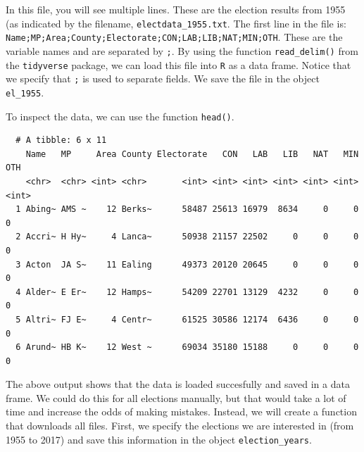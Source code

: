 \documentclass[12pt,oneside]{reedthesis}
\theoremstyle{definition}
\theoremstyle{definition}
\theoremstyle{definition}
\theoremstyle{remark}
\begin{document}
  In this file, you will see multiple lines. These are the election
  results from 1955 (as indicated by the filename,
  \texttt{electdata\_1955.txt}. The first line in the file is:
  \texttt{Name;MP;Area;County;Electorate;CON;LAB;LIB;NAT;MIN;OTH}. These
  are the variable names and are separated by \texttt{;}. By using the
  function \texttt{read\_delim()} from the \texttt{tidyverse} package, we
  can load this file into \texttt{R} as a data frame. Notice that we
  specify that \texttt{;} is used to separate fields. We save the file in
  the object \texttt{el\_1955}.
  \begin{Shaded}
  \begin{Highlighting}[]
  \NormalTok{ <-}\StringTok{ }\NormalTok{(}
    \NormalTok{, }
     
  \NormalTok{  )}
  \end{Highlighting}
  \end{Shaded}
  To inspect the data, we can use the function \texttt{head()}.
  \begin{Shaded}
  \begin{Highlighting}[]
  \NormalTok{)}
  \end{Highlighting}
  \end{Shaded}
  \begin{verbatim}
  # A tibble: 6 x 11
    Name   MP     Area County Electorate   CON   LAB   LIB   NAT   MIN   OTH
    <chr>  <chr> <int> <chr>       <int> <int> <int> <int> <int> <int> <int>
  1 Abing~ AMS ~    12 Berks~      58487 25613 16979  8634     0     0     0
  2 Accri~ H Hy~     4 Lanca~      50938 21157 22502     0     0     0     0
  3 Acton  JA S~    11 Ealing      49373 20120 20645     0     0     0     0
  4 Alder~ E Er~    12 Hamps~      54209 22701 13129  4232     0     0     0
  5 Altri~ FJ E~     4 Centr~      61525 30586 12174  6436     0     0     0
  6 Arund~ HB K~    12 West ~      69034 35180 15188     0     0     0     0
  \end{verbatim}
  The above output shows that the data is loaded succesfully and saved in
  a data frame. We could do this for all elections manually, but that
  would take a lot of time and increase the odds of making mistakes.
  Instead, we will create a function that downloads all files. First, we
  specify the elections we are interested in (from 1955 to 2017) and save
  this information in the object \texttt{election\_years}.
\end{document}

